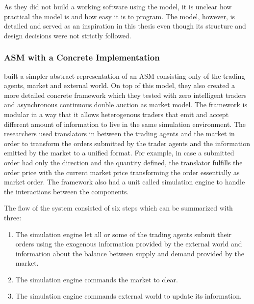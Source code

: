 
As they did not build a working software using the model, it is unclear
how practical the model is and how easy it is to program. The model, 
however, is detailed and served as an inspiration in this thesis even though
its structure and design decisions were not strictly followed.


\subsubsection{ASM with a Concrete Implementation}
\citet{Julien07} built a simpler abstract representation of an ASM consisting
only of the trading agents, market and external world. On top of this model, 
they also created a more detailed concrete framework which they tested with
zero intelligent traders and asynchronous continuous double auction as market
model. The framework is modular in a way that it allows heterogenous traders
that emit and accept different amount of information to live in the same 
simulation environment. The researchers used translators in between the 
trading agents and the market in order to transform the orders submitted by
the trader agents and the information emitted by the market to a unified format.
For example, in case a submitted order had only the direction and the quantity 
defined, the translator fulfills the order price with the current market price 
transforming the order essentially as market order. The framework also had a
unit called simulation engine to handle the interactions between the components.

The flow of the system consisted of six steps which can be summarized with three:
\begin{enumerate}
    \item The simulation engine let all or some of the trading agents submit their orders 
            using the exogenous information provided by the external world and 
            information about the balance between supply and demand provided by the market.
    \item The simulation engine commands the market to clear.
    \item The simulation engine commands external world to update its information.
\end{enumerate}



